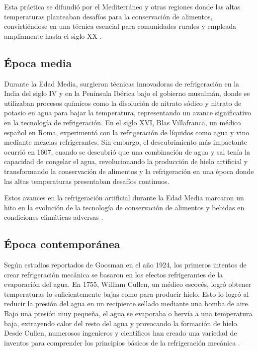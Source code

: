 Esta práctica se difundió por el Mediterráneo y otras regiones donde las altas temperaturas planteaban desafíos para la conservación de alimentos, convirtiéndose en una técnica esencial para comunidades rurales y empleada ampliamente hasta el siglo XX  \cite{jr2013}.

\subsection{Época media}
Durante la Edad Media, surgieron técnicas innovadoras de refrigeración en la India del siglo IV y en la Península Ibérica bajo el gobierno musulmán, donde se utilizaban procesos químicos como la disolución de nitrato sódico y nitrato de potasio en agua para bajar la temperatura, representando un avance significativo en la tecnología de refrigeración. En el siglo XVI, Blas Villafranca, un médico español en Roma, experimentó con la refrigeración de líquidos como agua y vino mediante mezclas refrigerantes. Sin embargo, el descubrimiento más impactante ocurrió en 1607, cuando se descubrió que una combinación de agua y sal tenía la capacidad de congelar el agua, revolucionando la producción de hielo artificial y transformando la conservación de alimentos y la refrigeración en una época donde las altas temperaturas presentaban desafíos continuos.

Estos avances en la refrigeración artificial durante la Edad Media marcaron un hito en la evolución de la tecnología de conservación de alimentos y bebidas en condiciones climáticas adversas \cite{bernad2023}.

\subsection{Época contemporánea}

Según estudios reportados de Goosman en el año 1924, los primeros intentos de crear refrigeración mecánica se basaron en los efectos refrigerantes de la evaporación del agua. En 1755, William Cullen, un médico escocés, logró obtener temperaturas lo suficientemente bajas como para producir hielo. Esto lo logró al reducir la presión del agua en un recipiente sellado mediante una bomba de aire. Bajo una presión muy pequeña, el agua se evaporaba o hervía a una temperatura baja, extrayendo calor del resto del agua y provocando la formación de hielo. Desde Cullen, numerosos ingenieros y científicos han creado una variedad de inventos para comprender los principios básicos de la refrigeración mecánica \cite{dincer2010}.

